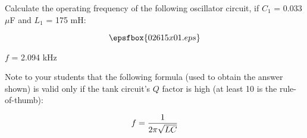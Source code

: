 

Calculate the operating frequency of the following oscillator circuit, if $C_1$ = 0.033 $\mu$F and $L_1$ = 175 mH:

$$\epsfbox{02615x01.eps}$$







$f$ = 2.094 kHz







Note to your students that the following formula (used to obtain the answer shown) is valid only if the tank circuit's $Q$ factor is high (at least 10 is the rule-of-thumb):

$$f = {1 \over {2 \pi \sqrt{LC}}}$$





